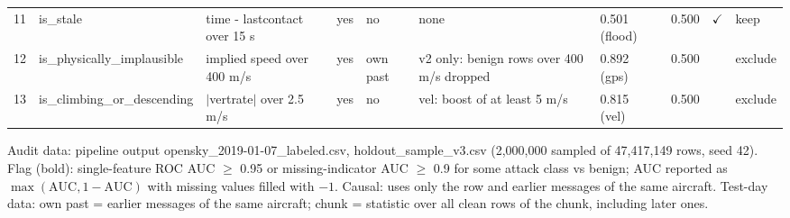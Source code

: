 \begin{table}[t]
\begin{tabularx}{\textwidth}{r l >{\raggedright\arraybackslash}X l l >{\raggedright\arraybackslash}X l l c l}
11 & is\_stale & time - lastcontact over 15 s & yes & no & none & 0.501 (flood) & 0.500 & $\checkmark$ & keep \\
12 & is\_physically\_implausible & implied speed over 400 m/s & yes & own past & v2 only: benign rows over 400 m/s dropped & 0.892 (gps) & 0.500 &  & exclude \\
13 & is\_climbing\_or\_descending & $|$vertrate$|$ over 2.5 m/s & yes & no & vel: boost of at least 5 m/s & 0.815 (vel) & 0.500 &  & exclude \\
\bottomrule\end{tabularx}
\par\smallskip\parbox{\textwidth}{\scriptsize Audit data: pipeline output opensky\_2019-01-07\_labeled.csv, holdout\_sample\_v3.csv (2,000,000 sampled of 47,417,149 rows, seed 42). Flag (bold): single-feature ROC AUC $\geq$ 0.95 or missing-indicator AUC $\geq$ 0.9 for some attack class vs benign; AUC reported as $\max(\mathrm{AUC}, 1-\mathrm{AUC})$ with missing values filled with $-1$. Causal: uses only the row and earlier messages of the same aircraft. Test-day data: own past = earlier messages of the same aircraft; chunk = statistic over all clean rows of the chunk, including later ones.}
\end{table}
